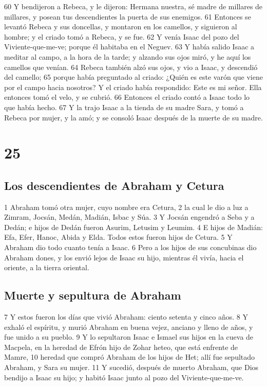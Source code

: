 60 Y bendijeron a Rebeca, y le dijeron: Hermana nuestra, sé madre de millares de millares, y posean tus descendientes la puerta de sus enemigos.
61 Entonces se levantó Rebeca y sus doncellas, y montaron en los camellos, y siguieron al hombre; y el criado tomó a Rebeca, y se fue.
62 Y venía Isaac del pozo del Viviente-que-me-ve; porque él habitaba en el Neguev.
63 Y había salido Isaac a meditar al campo, a la hora de la tarde; y alzando sus ojos miró, y he aquí los camellos que venían.
64 Rebeca también alzó sus ojos, y vio a Isaac, y descendió del camello;
65 porque había preguntado al criado: ¿Quién es este varón que viene por el campo hacia nosotros? Y el criado había respondido: Este es mi señor. Ella entonces tomó el velo, y se cubrió.
66 Entonces el criado contó a Isaac todo lo que había hecho.
67 Y la trajo Isaac a la tienda de su madre Sara, y tomó a Rebeca por mujer, y la amó; y se consoló Isaac después de la muerte de su madre.

\chapter{25}

\section*{Los descendientes de Abraham y Cetura}

1 Abraham tomó otra mujer, cuyo nombre era Cetura,
2 la cual le dio a luz a Zimram, Jocsán, Medán, Madián, Isbac y Súa.
3 Y Jocsán engendró a Seba y a Dedán; e hijos de Dedán fueron Asurim, Letusim y Leumim.
4 E hijos de Madián: Efa, Efer, Hanoc, Abida y Elda. Todos estos fueron hijos de Cetura.
5 Y Abraham dio todo cuanto tenía a Isaac.
6 Pero a los hijos de sus concubinas dio Abraham dones, y los envió lejos de Isaac su hijo, mientras él vivía, hacia el oriente, a la tierra oriental.

\section*{Muerte y sepultura de Abraham}

7 Y estos fueron los días que vivió Abraham: ciento setenta y cinco años.
8 Y exhaló el espíritu, y murió Abraham en buena vejez, anciano y lleno de años, y fue unido a su pueblo.
9 Y lo sepultaron Isaac e Ismael sus hijos en la cueva de Macpela, en la heredad de Efrón hijo de Zohar heteo, que está enfrente de Mamre,
10 heredad que compró Abraham de los hijos de Het; allí fue sepultado Abraham, y Sara su mujer.
11 Y sucedió, después de muerto Abraham, que Dios bendijo a Isaac su hijo; y habitó Isaac junto al pozo del Viviente-que-me-ve.

